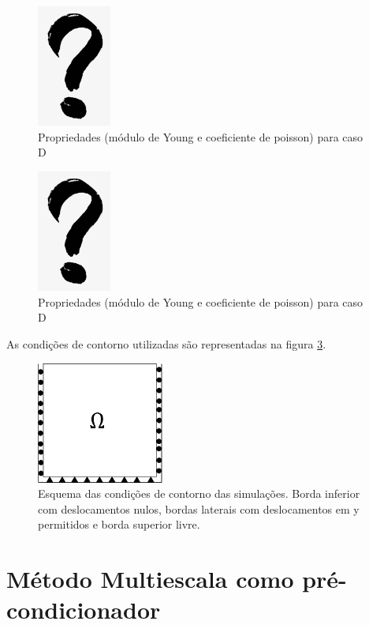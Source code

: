 \begin{figure}[!htbp]
    \label{fig:casoDgrid}
    \centering
    \includegraphics[height=4cm]{interrogacao.png}
    \caption{Propriedades (módulo de Young e coeficiente de poisson) para caso D }
\end{figure}

\begin{figure}[!htbp]
    \caption{Propriedades (módulo de Young e coeficiente de poisson) para caso D }
    \label{fig:casoEgrid}
    \centering
    \includegraphics[height=4cm]{interrogacao.png}
\end{figure}


As condições de contorno utilizadas são representadas na figura \ref{fig:CondicoesContorno}. 

\begin{figure}[!htbp]
    \caption{Esquema das condições de contorno das simulações. Borda inferior com deslocamentos nulos, bordas laterais com deslocamentos em y permitidos e borda superior livre.}
    \label{fig:CondicoesContorno}
    \centering
    \includegraphics[height=4cm]{chap08/figs/CondicoesContorno.png}
\end{figure}


\section{Método Multiescala como pré-condicionador}


